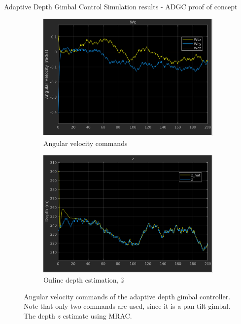 \documentclass[9pt]{beamer}
\newenvironment{figure*}%
{\begin{figure}}
{\end{figure}}
\begin{document}
\begin{frame}{Adaptive Depth Gimbal Control}
Simulation results - ADGC proof of concept
\begin{figure}[htbp]
	\centering
	\begin{subfigure}{0.5\textwidth}
		\centering
		\includegraphics[width=0.8\linewidth]{chapter2/angular_velocity_adaptive}
		\caption{Angular velocity commands}
	\end{subfigure}%
	\begin{subfigure}{0.5\textwidth}
		\centering
		\includegraphics[width=0.8\linewidth]{chapter2/z_adaptive}
		\caption{Online depth estimation, $\hat{z}$}
	\end{subfigure}
	\caption{Angular velocity commands of the adaptive depth gimbal controller. Note that only two commands are used, since it is a pan-tilt gimbal. The depth $z$ estimate using MRAC.}
	\label{adaptive_command}
\end{figure}	
\end{frame}
\end{document}
